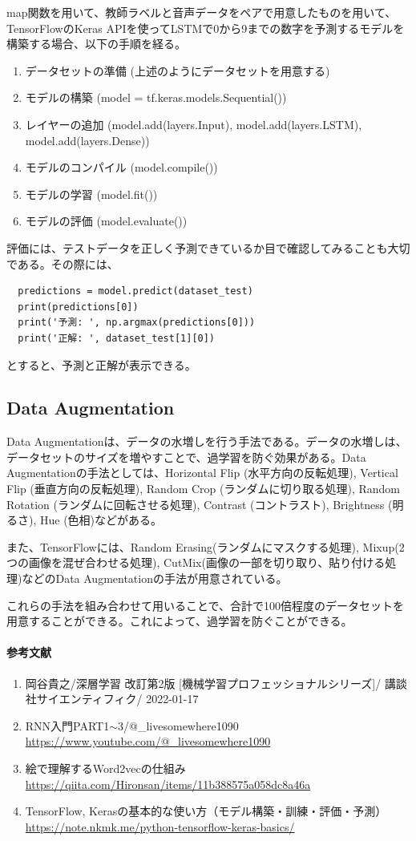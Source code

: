 \documentclass{ltjsarticle}
\begin{document}
map関数を用いて、教師ラベルと音声データをペアで用意したものを用いて、TensorFlowのKeras APIを使ってLSTMで0から9までの数字を予測するモデルを構築する場合、以下の手順を経る。
\begin{enumerate}
  \item データセットの準備 (上述のようにデータセットを用意する)
  \item モデルの構築 (model = tf.keras.models.Sequential())
  \item レイヤーの追加 (model.add(layers.Input), model.add(layers.LSTM), model.add(layers.Dense))
  \item モデルのコンパイル (model.compile())
  \item モデルの学習 (model.fit())
  \item モデルの評価 (model.evaluate())
\end{enumerate}
  
評価には、テストデータを正しく予測できているか目で確認してみることも大切である。その際には、
\begin{itembox}[l]{}
\begin{verbatim}
  predictions = model.predict(dataset_test)
  print(predictions[0])
  print('予測: ', np.argmax(predictions[0]))
  print('正解: ', dataset_test[1][0])
\end{verbatim}
\end{itembox}
とすると、予測と正解が表示できる。


\subsection{Data Augmentation}
Data Augmentationは、データの水増しを行う手法である。データの水増しは、データセットのサイズを増やすことで、過学習を防ぐ効果がある。Data Augmentationの手法としては、Horizontal Flip (水平方向の反転処理), Vertical Flip (垂直方向の反転処理), Random Crop (ランダムに切り取る処理), 
Random Rotation (ランダムに回転させる処理), Contrast (コントラスト), Brightness (明るさ), Hue (色相)などがある。
\par
また、TensorFlowには、Random Erasing(ランダムにマスクする処理), Mixup(2つの画像を混ぜ合わせる処理), CutMix(画像の一部を切り取り、貼り付ける処理)などのData Augmentationの手法が用意されている。
\par
これらの手法を組み合わせて用いることで、合計で100倍程度のデータセットを用意することができる。これによって、過学習を防ぐことができる。

\paragraph{参考文献}
\begin{enumerate}
  \item 岡谷貴之/深層学習 改訂第2版 [機械学習プロフェッショナルシリーズ]/ 講談社サイエンティフィク/ 2022-01-17
  \item RNN入門PART1$\sim$3/@\_livesomewhere1090 \url{https://www.youtube.com/@\_livesomewhere1090}
  \item 絵で理解するWord2vecの仕組み \url{https://qiita.com/Hironsan/items/11b388575a058dc8a46a}
  \item TensorFlow, Kerasの基本的な使い方（モデル構築・訓練・評価・予測）\url{https://note.nkmk.me/python-tensorflow-keras-basics/}
\end{enumerate}
\end{document}
